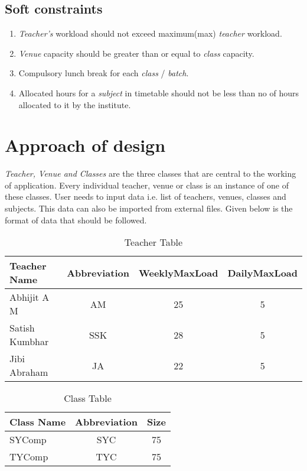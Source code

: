 \subsection{Soft constraints}
\begin{enumerate}
\item \textit{Teacher's} workload should not exceed maximum(max) \textit{teacher} workload.
\item \textit{Venue} capacity should be greater than or equal to \textit{class} capacity.
\item Compulsory lunch break for each \textit{class} / \textit{batch}.
\item Allocated hours for a \textit{subject} in timetable should not be less than no of hours allocated to it by the institute. 
\end{enumerate}

\newpage
\section{Approach of design}
\textit{Teacher, Venue and Classes} are the three classes that are central to the working of application. Every individual teacher, venue or class is an instance of one of these classes. User needs to input data i.e. list of teachers, venues, classes and subjects. This data can also be imported from external files. Given below is the format of data that should be followed.


\begin{table}[h!]
\centering
\begin{tabular}{|l|c|c|c|}

\hline
Teacher Name & Abbreviation & WeeklyMaxLoad & DailyMaxLoad\\
\hline
Abhijit A M & AM & 25 & 5\\
\hline
Satish Kumbhar & SSK & 28 & 5\\
\hline
Jibi Abraham & JA & 22 & 5\\
\hline
\end{tabular}
\caption{Teacher Table}
\label{tab:template}
\end{table}

\begin{table}[h!]
\centering
\begin{tabular}{|l|c|c|}

\hline
 Class Name & Abbreviation & Size\\
\hline
SYComp & SYC & 75\\
\hline
TYComp & TYC & 75\\
\hline 
\end{tabular}
\caption{Class Table}
\label{tab:template}
\end{table}

